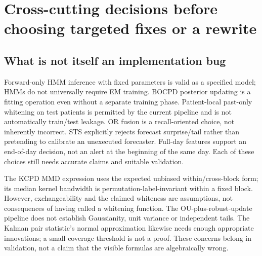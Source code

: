 \documentclass[11pt,a4paper]{article}
\begin{document}
\section{Cross-cutting decisions before choosing targeted fixes or a rewrite}

\subsection{What is not itself an implementation bug}
Forward-only HMM inference with fixed parameters is valid as a specified model;
HMMs do not universally require EM training. BOCPD posterior updating is a fitting
operation even without a separate training phase. Patient-local past-only whitening
on test patients is permitted by the current pipeline and is not automatically
train/test leakage. OR fusion is a recall-oriented choice, not inherently incorrect.
STS explicitly rejects forecast surprise/tail rather than pretending to calibrate
an unexecuted forecaster. Full-day features support an end-of-day decision, not an
alert at the beginning of the same day. Each of these choices still needs accurate
claims and suitable validation.

The KCPD MMD expression uses the expected unbiased within/cross-block form; its
median kernel bandwidth is permutation-label-invariant within a fixed block.
However, exchangeability and the claimed whiteness are assumptions, not consequences
of having called a whitening function. The OU-plus-robust-update pipeline does not
establish Gaussianity, unit variance or independent tails. The Kalman pair statistic's
normal approximation likewise needs enough appropriate innovations; a small coverage
threshold is not a proof. These concerns belong in validation, not a claim that the
visible formulas are algebraically wrong.
\end{document}
